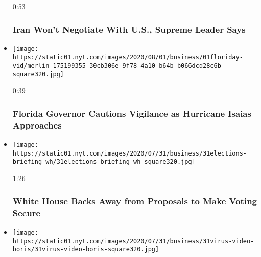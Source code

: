 \begin{itemize}
  0:53

  \hypertarget{iran-wont-negotiate-with-us-supreme-leader-says}{%
  \subsubsection{Iran Won't Negotiate With U.S., Supreme Leader
  Says}\label{iran-wont-negotiate-with-us-supreme-leader-says}}
\item
  \href{https://www.nytimes.com/video/us/100000007268424/desantis-florida-hurricane-isaias.html?action=click\&module=video-series-bar\&region=header\&pgtype=Article\&playlistId=video/latest-video}{}

  \texttt{[image: https://static01.nyt.com/images/2020/08/01/business/01floriday-vid/merlin\_175199355\_30cb306e-9f78-4a10-b64b-b066dcd28c6b-square320.jpg]}

  0:39

  \hypertarget{florida-governor-cautions-vigilance-as-hurricane-isaias-approaches}{%
  \subsubsection{Florida Governor Cautions Vigilance as Hurricane Isaias
  Approaches}\label{florida-governor-cautions-vigilance-as-hurricane-isaias-approaches}}
\item
  \href{https://www.nytimes.com/video/us/100000007267362/white-house-mail-in-ballots-election.html?action=click\&module=video-series-bar\&region=header\&pgtype=Article\&playlistId=video/latest-video}{}

  \texttt{[image: https://static01.nyt.com/images/2020/07/31/business/31elections-briefing-wh/31elections-briefing-wh-square320.jpg]}

  1:26

  \hypertarget{white-house-backs-away-from-proposals-to-make-voting-secure}{%
  \subsubsection{White House Backs Away from Proposals to Make Voting
  Secure}\label{white-house-backs-away-from-proposals-to-make-voting-secure}}
\item
  \href{https://www.nytimes.com/video/us/politics/100000007266983/johnson-coronavirus-restrictions.html?action=click\&module=video-series-bar\&region=header\&pgtype=Article\&playlistId=video/latest-video}{}

  \texttt{[image: https://static01.nyt.com/images/2020/07/31/business/31virus-video-boris/31virus-video-boris-square320.jpg]}


\end{itemize}
